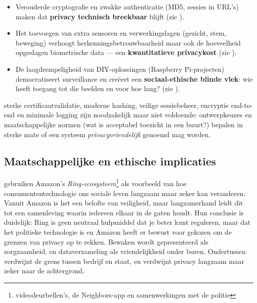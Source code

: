 \documentclass[nonacm, sigconf]{acmart}
\begin{document}
    \begin{itemize}
        \item Verouderde cryptografie en zwakke authenticatie (MD5, sessies in URL's) maken dat \textbf{privacy technisch breekbaar} blijft (zie \parencite{liu2021ethical}).
        \item Het toevoegen van extra sensoren en verwerkingslagen (gezicht, stem, beweging) verhoogt herkenningsbetrouwbaarheid maar ook de hoeveelheid opgeslagen biometrische data — een \textbf{kwantitatieve privacykost} (zie \parencite{chaudhari2020smart}).
        \item De laagdrempeligheid van DIY-oplossingen (Raspberry Pi-projecten) democratiseert surveillance en creëert een \textbf{sociaal-ethische blinde vlek}: wie heeft toegang tot die beelden en voor hoe lang? (zie \parencite{lalitha2019smart}).
    \end{itemize}

    sterke certificaatvalidatie, moderne hashing, veilige sessiebeheer, encryptie end-to-end en minimale logging zijn noodzakelijk maar niet voldoende: ontwerpkeuzes en maatschappelijke normen (wat is acceptabel toezicht in een buurt?) bepalen in sterke mate of een systeem \emph{privacyvriendelijk} genoemd mag worden.

    \subsection{Maatschappelijke en ethische implicaties}\label{subsec:maatschappelijke-en-ethische-implicaties}

    \parencite{selinger2022amazon} gebruiken Amazon's \textit{Ring-ecosysteem}\footnote{videodeurbellen's, de Neighbors-app en samenwerkingen met de politie} als voorbeeld van hoe consumententechnologie ons sociale leven langzaam maar zeker kan veranderen.
    Vanuit Amazon is het een belofte van veiligheid, maar langzamerhand leidt dit tot een samenleving waarin iedereen elkaar in de gaten houdt.
    Hun conclusie is duidelijk: Ring is geen neutraal hulpmiddel dat je beter kunt reguleren, maar dat het politieke technologie is en Amazon heeft er bewust voor gekozen om de grenzen van privacy op te rekken.
    Bewaken wordt gepresenteerd als zorgzaamheid, en dataverzameling als vriendelijkheid onder buren.
    Ondertussen verdwijnt de grens tussen bedrijf en staat, en verdwijnt privacy langzaam maar zeker naar de achtergrond.
\end{document}
